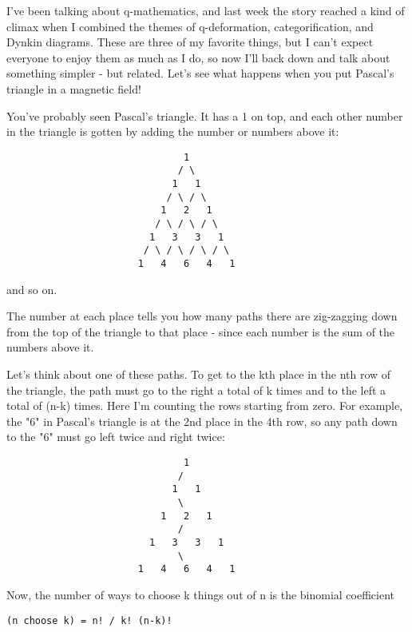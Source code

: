 



I've been talking about q-mathematics, and last week the story reached 
a kind of climax when I combined the themes of q-deformation,
categorification, and Dynkin diagrams.  These are three of my favorite
things, but I can't expect everyone to enjoy them as much as I do, so
now I'll back down and talk about something simpler - but related. 
Let's see what happens when you put Pascal's triangle in a magnetic field!

You've probably seen Pascal's triangle.  It has a 1 on top, and
each other number in the triangle is gotten by adding the number 
or numbers above it:

\begin{verbatim}
                               1
                              / \
                             1   1
                            / \ / \
                           1   2   1
                          / \ / \ / \
                         1   3   3   1
                        / \ / \ / \ / \
                       1   4   6   4   1
\end{verbatim}
    
and so on.  

The number at each place tells you how many paths there are zig-zagging
down from the top of the triangle to that place - since each number is
the sum of the numbers above it.  

Let's think about one of these paths.  To get to the kth place in the
nth row of the triangle, the path must go to the right a total of k
times and to the left a total of (n-k) times.  Here I'm counting the
rows starting from zero.  For example, the "6" in Pascal's triangle is
at the 2nd place in the 4th row, so any path down to the "6" must go
left twice and right twice:

\begin{verbatim}
                               1
                              / 
                             1   1
                              \ 
                           1   2   1
                              /   
                         1   3   3   1
                              \   
                       1   4   6   4   1
\end{verbatim}
    
Now, the number of ways to choose k things out of n is the binomial
coefficient

\begin{verbatim}
(n choose k) = n! / k! (n-k)!
\end{verbatim}
    
